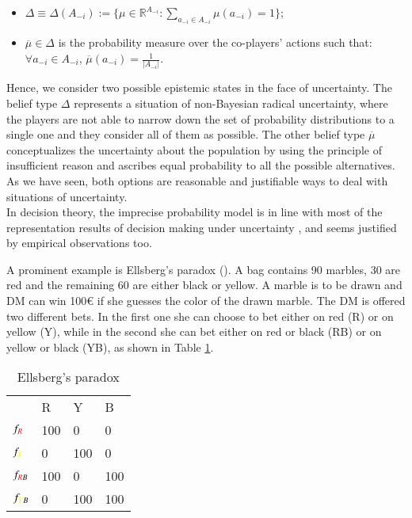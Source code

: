\documentclass[fleqn,reqno,11pt]{article}
\begin{document}
\begin{itemize}

\item $ \Delta \equiv \Delta(A_{-i}) :=\lbrace \mu \in \mathbb{R}^{A_{-i}}: \sum_{a_{-i} \in A_{-i}} \mu(a_{-i}) = 1 \rbrace$;

\item $\overline{\mu} \in \Delta$ is the probability measure over the co-players' actions such that: $\forall a_{-i} \in A_{-i}$, $\overline{\mu}(a_{-i})= \frac{1}{|A_{-i}|}$.

\end{itemize} 

Hence, we consider two possible epistemic states in the face of uncertainty. The belief type $\Delta$ represents a situation of non-Bayesian radical uncertainty, where the players are not able to narrow down the set of probability distributions to a single one and they consider all of them as possible. The other belief type $\overline{\mu}$ conceptualizes the uncertainty about the population by using the principle of insufficient reason and ascribes equal probability to all the possible alternatives. As we have seen, both options are reasonable and justifiable ways to deal with situations of uncertainty. \\

In decision theory, the imprecise probability model is in line with most of the representation results of decision making under uncertainty \citep[e.g.,][]{gilsch89,KlibMarMuk05,GhirMar02}, and seems justified by empirical observations too.

A prominent example is Ellsberg's paradox (\citet{ells61}). A bag contains 90 marbles, 30 are red and the remaining 60 are either black or yellow. A marble is to be drawn and DM can win 100€ if she guesses the color of the drawn marble. The DM is offered two different bets. In the first one she can choose to bet either on red (R) or on yellow (Y), while in the second she can bet either on red or black (RB) or on yellow or black (YB), as shown in Table \ref{Ellsberg}.



\begin{table}[h]
\centering
\begin{tabular}{@{}llll@{}}
\cmidrule(l){2-4}
\multicolumn{1}{c}{} & {\color{red}R}   & {\color{yellow}Y}   & B   \\ \cmidrule(l){2-4} 
$f_{{\color{red}R}}$              & 100 & 0   & 0   \\
$f_{{\color{yellow}Y}}$              & 0   & 100 & 0   \\
$f_{{\color{red}R}B}$            & 100 & 0   & 100 \\
$f_{{\color{yellow}Y}B}$             & 0   & 100 & 100 \\ \bottomrule
\end{tabular}
\caption{Ellsberg's paradox}
\label{Ellsberg}
\end{table}
\end{document}

